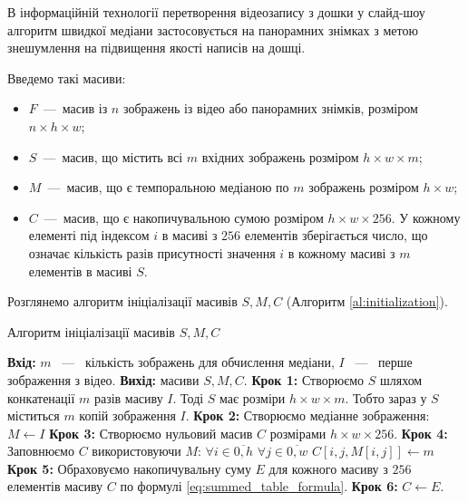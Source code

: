 В інформаційній технології перетворення відеозапису з дошки у слайд-шоу 
\cite{creating_slides_1} \cite{patent_board}
алгоритм швидкої медіани застосовується на панорамних знімках 
з метою знешумлення на підвищення якості написів на дошці.

Введемо такі масиви:
\begin{itemize}
    \item $F$~---~масив із $n$ зображень із відео або панорамних знімків, розміром $n \times  h \times w$;
    \item $S$~---~масив, що містить  всі $m$ вхідних зображень розміром $h \times w \times m$;
    \item $M$~---~масив, що є темпоральною медіаною по $m$ зображень розміром $h \times w$;
    \item $C$~---~масив, що є накопичувальною сумою розміром $h \times w \times 256$. У кожному елементі під індексом $i$ в
          масиві з $256$ елементів зберігається число, що означає кількість разів присутності значення $i$ в кожному
          масиві з $m$ елементів в масиві $S$.
\end{itemize}

Розглянемо алгоритм ініціалізації масивів $S, M, C$ (Алгоритм \ref{al:initialization}).
\begin{algorithm}[H]
    \caption{Алгоритм ініціалізації масивів $S, M, C$}
    \begin{algorithmic}
        \State \textbf{Вхід:} $m$ ~---~ кількість зображень для обчислення медіани,
        $I$ ~---~ перше зображення з відео.
        \State \textbf{Вихід:} масиви $S, M, C$.
        \State \textbf{Крок 1:} Створюємо $S$ шляхом конкатенації $m$ разів масиву $I$.
        Тоді $S$ має розміри $h \times w \times m$. Тобто зараз у $S$ міститься
        $m$ копій зображення $I$.
        \State \textbf{Крок 2:} Створюємо медіанне зображення: $M \gets I$
        \State \textbf{Крок 3:} Створюємо нульовий масив $C$ розмірами $h \times w \times 256$.
        \State \textbf{Крок 4:} Заповнюємо $C$ використовуючи $M$:
        \State $\forall i \in \overline{0,h}$
        \State \qquad $\forall j \in \overline{0,w}$
        \State \qquad \qquad $C[i,j,M[i,j]] \gets m$
        \State \textbf{Крок 5:} Обраховуємо накопичувальну суму $E$ для кожного масиву з $256$ елементів
        масиву $C$ по формулі \ref{eq:summed_table_formula}.
        \State \textbf{Крок 6:} $C \gets E$.
    \end{algorithmic}
    \label{al:initialization}
\end{algorithm}

